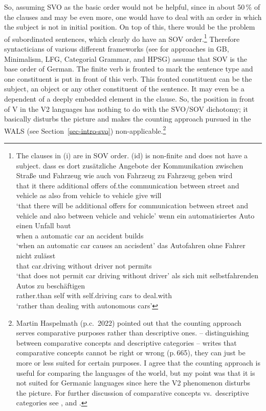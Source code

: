 So, assuming
SVO as the basic order would not be helpful, since in about 50\,\% of the clauses and may be even
more, one would have to deal with an order in which the subject is not in initial position. On top of
this, there would be the problem of subordinated sentences, which clearly do have an SOV
order.\footnote{
The clauses in (i) are in SOV order. (id) is non-finite and does not have a subject.
\eal
\ex 
\gll dass es dort zusätzliche Angebote der Kommunikation zwischen Straße und Fahrzeug wie auch von Fahrzeug zu Fahrzeug geben wird\\
     that it there additional offers   of.the communication between street and vehicle as also from vehicle to vehicle give will\\
\glt `that there will be additional offers for communication between street and vehicle and also
between vehicle and vehicle'
\ex 
\gll wenn ein automatisiertes Auto einen Unfall baut\\
     when a   automatic       car  an accident  builds\\
\glt `when an automatic car causes an accisdent'
\ex 
\gll das Autofahren ohne Fahrer nicht zulässt\\
     that car.driving without driver not permits\\
\glt `that does not permit car driving without driver'
\ex
\gll als sich mit selbstfahrenden Autos zu beschäftigen\\
     rather.than self with self.driving cars to deal.with\\
\glt `rather than dealing with autonomous cars'
\zllast
}
 Therefore syntacticians of various different frameworks (see \citealp{MuellerGT-Eng} for
approaches in GB, Minimalism, LFG, Categorial Grammar, and HPSG) assume that SOV is the base order of
German. The finite verb is fronted to mark the sentence type and one constituent is put in front of
this verb. This fronted constituent can be the subject, an object or any other constituent of the
sentence. It may even be a dependent of a deeply embedded element in the clause. So, the position
in front of V in the V2 languages has nothing to do with the SVO/SOV dichotomy; it basically disturbs
the picture and makes the counting approach pursued in the WALS (see Section~\ref{sec-intro-svo})
non-applicable.\footnote{
  Martin Haspelmath (p.c.\ 2022) pointed out that the counting approach serves comparative
  purposes rather than descriptive ones. \citet{Haspelmath2010a} -- distinguishing between comparative concepts and descriptive
  categories -- writes that comparative concepts cannot be right or wrong (p.\,665), they can just be more or
  less suited for certain purposes. I agree that the counting approach is useful for comparing the
  languages of the world, but my point was that it is not suited for Germanic languages since here
  the V2 phenomenon disturbs the picture. For further discussion of comparative concepts vs.\ descriptive categories
  see ,  and .
}

